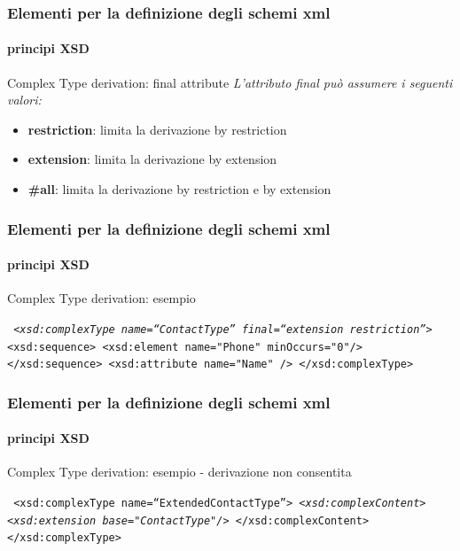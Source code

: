 \begin{frame}
	\frametitle{Elementi per la definizione degli schemi xml}
	\framesubtitle{principi XSD}
	\addtocounter{nframe}{1}

	\begin{block}{Complex Type derivation: final attribute}
		\textit{L'attributo final può assumere i seguenti valori:}
		\begin{itemize}
			\item \textbf{restriction}: limita la derivazione by restriction
			\item \textbf{extension}: limita la derivazione by extension
			\item \textbf{\#all}: limita la derivazione by restriction e by extension
		\end{itemize}

	\end{block}

\end{frame}

\begin{frame}
	\frametitle{Elementi per la definizione degli schemi xml}
	\framesubtitle{principi XSD}
	\addtocounter{nframe}{1}

	\begin{block}{Complex Type derivation: esempio}

		\texttt{
			\emph{<xsd:complexType name=``ContactType'' final=``extension restriction''>}
			<xsd:sequence>
			<xsd:element name="Phone" minOccurs="0"/>
			</xsd:sequence>
			<xsd:attribute name="Name" />
			</xsd:complexType>
		}
	\end{block}
\end{frame}

\begin{frame}
	\frametitle{Elementi per la definizione degli schemi xml}
	\framesubtitle{principi XSD}
	\addtocounter{nframe}{1}

	\begin{block}{Complex Type derivation: esempio - derivazione non consentita}

		\texttt{
			<xsd:complexType name=``ExtendedContactType''>
			\emph{<xsd:complexContent>}
			\emph{<xsd:extension base="ContactType"/>}
			</xsd:complexContent>
			</xsd:complexType>
		}
	\end{block}
\end{frame}

